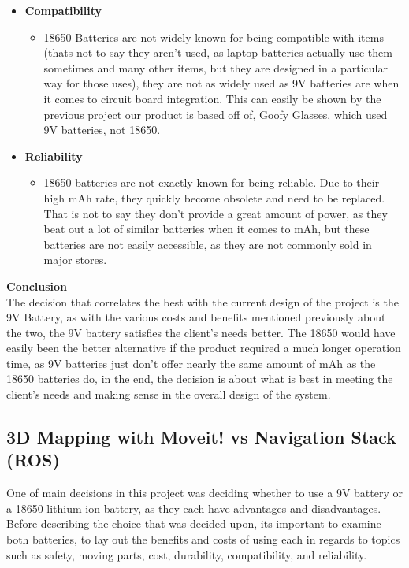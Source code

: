 \documentclass[12pt]{article}
\begin{document}
{\begin{itemize}
\begin{itemize}
						\end{itemize}
						\item \textbf{Compatibility}
						\begin{itemize}
							\item 18650 Batteries are not widely known for being compatible with items (thats not to say they aren't used, as laptop batteries actually use them sometimes and many other items, but they are designed in a particular way for those uses), they are not as widely used as 9V batteries are when it comes to circuit board integration. This can easily be shown by the previous project our product is based off of, Goofy Glasses, which used 9V batteries, not 18650.
						\end{itemize}
						\item \textbf{Reliability}
						\begin{itemize}
							\item 18650 batteries are not exactly known for being reliable. Due to their high mAh rate, they quickly become obsolete and need to be replaced. That is not to say they don't provide a great amount of power, as they beat out a lot of similar batteries when it comes to mAh, but these batteries are not easily accessible, as they are not commonly sold in major stores.
						\end{itemize}
					\end{itemize}
					}
					
					\noindent\textbf{Conclusion}\\
					\indent The decision that correlates the best with the current design of the project is the 9V Battery, as with the various costs and benefits mentioned previously about the two, the 9V battery satisfies the client's needs better. The 18650 would have easily been the better alternative if the product required a much longer operation time, as 9V batteries just don't offer nearly the same amount of mAh as the 18650 batteries do, in the end, the decision is about what is best in meeting the client's needs and making sense in the overall design of the system.
					
					\subsection{3D Mapping with Moveit! vs Navigation Stack (ROS)}
					One of main decisions in this project was deciding whether to use a 9V battery or a 18650 lithium ion battery, as they each have advantages and disadvantages. Before describing the choice that was decided upon, its important to examine both batteries, to lay out the benefits and costs of using each in regards to topics such as safety, moving parts, cost, durability, compatibility, and reliability.\\
					
\end{document}
